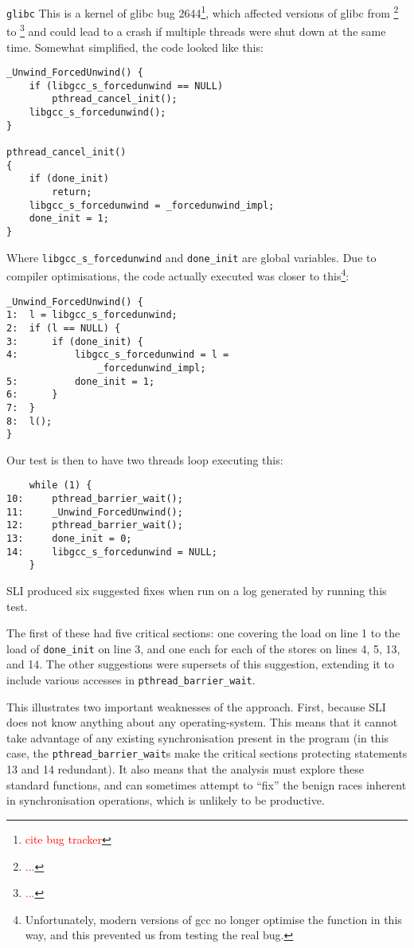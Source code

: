 \documentclass[10pt,twocolumn,preprint,natbib,authoryear]{sigplanconf}
\newcommand{\editorial}[1]{\textcolor{red}{\footnote{\textcolor{red}{#1}}}}
\begin{document}
\verb|glibc| This is a kernel of glibc bug 2644\editorial{cite bug
  tracker}, which affected versions of glibc from \editorial{...}  to
\editorial{...} and could lead to a crash if multiple threads were
shut down at the same time.  Somewhat simplified, the code looked like
this:

\begin{verbatim}
_Unwind_ForcedUnwind() {
    if (libgcc_s_forcedunwind == NULL)
        pthread_cancel_init();
    libgcc_s_forcedunwind();
}

pthread_cancel_init()
{
    if (done_init)
        return;
    libgcc_s_forcedunwind = _forcedunwind_impl;
    done_init = 1;
}
\end{verbatim}

Where \verb|libgcc_s_forcedunwind| and \verb|done_init| are global
variables.  Due to compiler optimisations, the code actually executed
was closer to this\footnote{Unfortunately, modern versions of gcc no
  longer optimise the function in this way, and this prevented us from
  testing the real bug.}:

\begin{verbatim}
_Unwind_ForcedUnwind() {
1:  l = libgcc_s_forcedunwind;
2:  if (l == NULL) {
3:      if (done_init) {
4:          libgcc_s_forcedunwind = l =
                _forcedunwind_impl;
5:          done_init = 1;
6:      }
7:  }
8:  l();
}
\end{verbatim}

Our test is then to have two threads loop executing this:

\begin{verbatim}
    while (1) {
10:     pthread_barrier_wait();
11:     _Unwind_ForcedUnwind();
12:     pthread_barrier_wait();
13:     done_init = 0;
14:     libgcc_s_forcedunwind = NULL;
    }
\end{verbatim}

SLI produced six suggested fixes when run on a log generated by
running this test.

The first of these had five critical sections: one covering the load
on line 1 to the load of \verb|done_init| on line 3, and one each for
each of the stores on lines 4, 5, 13, and 14.  The other suggestions
were supersets of this suggestion, extending it to include various
accesses in \verb|pthread_barrier_wait|.

This illustrates two important weaknesses of the approach.  First,
because SLI does not know anything about any operating-system.  This
means that it cannot take advantage of any existing synchronisation
present in the program (in this case, the \verb|pthread_barrier_wait|s
make the critical sections protecting statements 13 and 14 redundant).
It also means that the analysis must explore these standard functions,
and can sometimes attempt to ``fix'' the benign races inherent in
synchronisation operations, which is unlikely to be productive.
\end{document}
